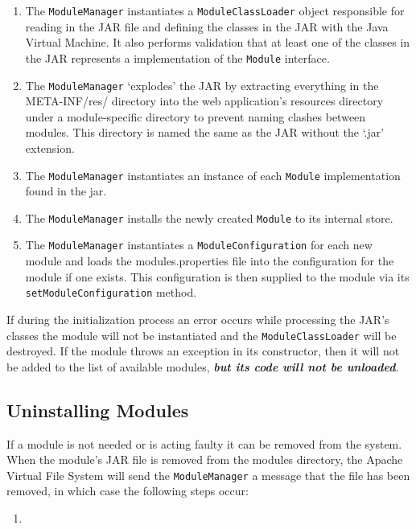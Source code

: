 \documentclass[letterpaper]{report}
\begin{document}
\begin{enumerate}
\item The \texttt{ModuleManager} instantiates a \texttt{ModuleClassLoader} object responsible for reading in the JAR file and defining the classes in the JAR with the Java Virtual Machine. It also performs validation that at least one of the classes in the JAR represents a implementation of the \texttt{Module} interface.
\item The \texttt{ModuleManager} `explodes' the JAR by extracting everything in the META-INF/res/ directory into the web application's resources directory under a module-specific directory to prevent naming clashes between modules. This directory is named the same as the JAR without the `.jar' extension.
\item The \texttt{ModuleManager} instantiates an instance of each \texttt{Module} implementation found in the jar.
\item The \texttt{ModuleManager} installs the newly created \texttt{Module} to its internal store.
\item The \texttt{ModuleManager} instantiates a \texttt{ModuleConfiguration} for each new module and loads the modules.properties file into the configuration for the module if one exists. This configuration is then supplied to the module via its \texttt{setModuleConfiguration} method.
\end{enumerate}

If during the initialization process an error occurs while processing the JAR's classes the module will not be instantiated and the \texttt{ModuleClassLoader} will be destroyed. If the module throws an exception in its constructor, then it will not be added to the list of available modules, \textbf{\textit{but its code will not be unloaded}}.

\subsection{Uninstalling Modules}
\label{uninstalling-modules}
If a module is not needed or is acting faulty it can be removed from the system. When the module's JAR file is removed from the modules directory, the Apache Virtual File System will send the \texttt{ModuleManager} a message that the file has been removed, in which case the following steps occur:

\begin{enumerate}
\item 
\end{enumerate}
\end{document}
